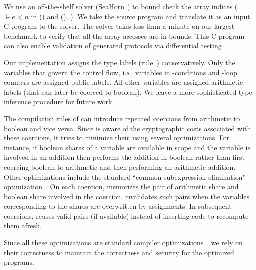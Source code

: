We use an off-the-shelf solver
(SeaHorn~\cite{seahorn}) to bound check the array indices
($\models e < n$
in ({}) and ({}),
). We take the \tool source program and
translate it as an input C program to the solver. The solver takes less
than a minute on our largest benchmark to verify that all the array
accesses are in-bounds. This C program can also enable
validation of \tool generated protocols via differential testing~\cite{mckeeman,frigate}.

Our implementation assigns the type labels (rule~{})
conservatively. Only the variables that govern the control flow, i.e.,
variables in -conditions and -loop counters are
assigned public labels.
All other variables are assigned arithmetic labels (that can later be
coerced to boolean).
We leave a more sophisticated type inference procedure for future work.

The compilation rules of  can introduce
repeated coercions from arithmetic to
boolean and vice versa.
Since \tool is aware of the cryptographic costs associated with these coercions,
it tries to minimize them using several optimizations.
For instance, if boolean shares of a variable are available in scope and the variable is involved in
an addition then \tool performs the addition in boolean rather than first coercing boolean to arithmetic
and then performing an arithmetic addition. 
Other optimizations include the standard ``common subexpression elimination"
optimization~\cite{dragonbook}.
On each coercion, \tool memorizes the pair of arithmetic
share and boolean share involved in the coercion. 
\tool invalidates such pairs when the variables corresponding to the
shares are overwritten by assignments. 
In subsequent coercions, \tool  reuses valid pairs (if available)
instead of inserting code to recompute them afresh.

Since all these optimizations are standard compiler
optimizations~\cite{dragonbook}, we rely on their correctness to
maintain the correctness and security for the optimized programs.

